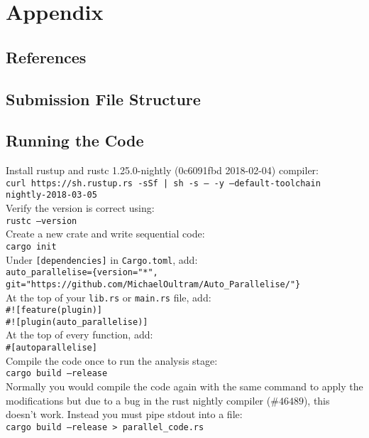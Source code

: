 \chapter{Appendix}
\section{References}
\printbibliography[heading=none]

\section{Submission File Structure}

\section{Running the Code}
Install rustup and rustc 1.25.0-nightly (0c6091fbd 2018-02-04) compiler: \\
\texttt{curl https://sh.rustup.rs -sSf | sh -s -- -y --default-toolchain nightly-2018-03-05} \\

Verify the version is correct using: \\
\texttt{rustc --version} \\

Create a new crate and write sequential code: \\
\texttt{cargo init} \\

Under \texttt{[dependencies]} in \texttt{Cargo.toml}, add: \\
\texttt{auto\_parallelise=\{version="*", git="https://github.com/MichaelOultram/Auto\_Parallelise/"\}} \\

At the top of your \texttt{lib.rs} or \texttt{main.rs} file, add: \\
\texttt{\#![feature(plugin)]} \\
\texttt{\#![plugin(auto\_parallelise)]} \\

At the top of every function, add: \\
\texttt{\#[autoparallelise]} \\

Compile the code once to run the analysis stage: \\
\texttt{cargo build --release} \\

Normally you would compile the code again with the same command to apply the modifications but due to a bug in the rust nightly compiler (\href{https://github.com/rust-lang/rust/issues/46489}{$\#46489$}), this doesn't work. Instead you must pipe stdout into a file: \\
\texttt{cargo build --release > parallel\_code.rs} \\

